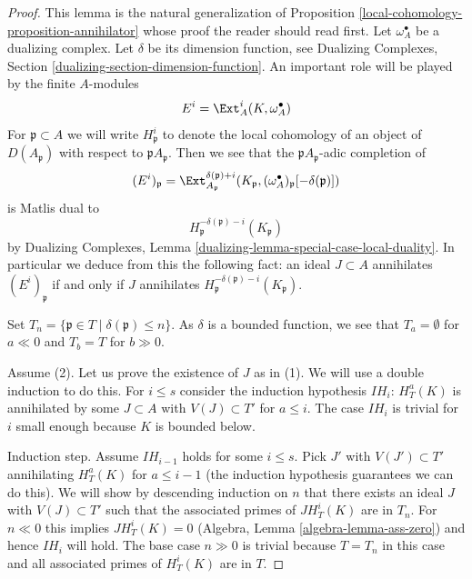 \begin{proof}
This lemma is the natural generalization of
Proposition \ref{local-cohomology-proposition-annihilator}
whose proof the reader should read first.
Let $\omega_A^\bullet$ be a dualizing complex. Let $\delta$ be its
dimension function, see Dualizing Complexes, Section
\ref{dualizing-section-dimension-function}.
An important role will be played by the finite $A$-modules
$$
E^i = \Ext_A^i(K, \omega_A^\bullet)
$$
For $\mathfrak p \subset A$ we will write $H^i_\mathfrak p$ to denote the
local cohomology of an object of $D(A_\mathfrak p)$ with respect to
$\mathfrak pA_\mathfrak p$. Then we see that
the $\mathfrak pA_\mathfrak p$-adic completion of
$$
(E^i)_\mathfrak p =
\Ext^{\delta(\mathfrak p) + i}_{A_\mathfrak p}(K_\mathfrak p,
(\omega_A^\bullet)_\mathfrak p[-\delta(\mathfrak p)])
$$
is Matlis dual to
$$
H^{-\delta(\mathfrak p) - i}_{\mathfrak p}(K_\mathfrak p)
$$
by
Dualizing Complexes, Lemma \ref{dualizing-lemma-special-case-local-duality}.
In particular we deduce from this the
following fact: an ideal $J \subset A$ annihilates
$(E^i)_\mathfrak p$ if and only if $J$ annihilates
$H^{-\delta(\mathfrak p) - i}_{\mathfrak p}(K_\mathfrak p)$.

\medskip\noindent
Set $T_n = \{\mathfrak p \in T \mid \delta(\mathfrak p) \leq n\}$.
As $\delta$ is a bounded function, we see that
$T_a = \emptyset$ for $a \ll 0$ and $T_b = T$ for $b \gg 0$.

\medskip\noindent
Assume (2). Let us prove the existence of $J$ as in (1).
We will use a double induction to do this. For $i \leq s$
consider the induction hypothesis $IH_i$:
$H^a_T(K)$ is annihilated by some $J \subset A$ with $V(J) \subset T'$
for $a \leq i$. The case $IH_i$ is trivial for $i$ small
enough because $K$ is bounded below.

\medskip\noindent
Induction step. Assume $IH_{i - 1}$ holds for some $i \leq s$.
Pick $J'$ with $V(J') \subset T'$ annihilating $H^a_T(K)$ for
$a \leq i - 1$ (the induction hypothesis guarantees we can
do this). We will show by descending induction on $n$
that there exists an ideal $J$ with $V(J) \subset T'$ such that the
associated primes of $J H^i_T(K)$ are in $T_n$.
For $n \ll 0$ this implies $JH^i_T(K) = 0$
(Algebra, Lemma \ref{algebra-lemma-ass-zero})
and hence $IH_i$ will hold.
The base case $n \gg 0$ is trivial because $T = T_n$ in this case
and all associated primes of $H^i_T(K)$ are in $T$.


\end{proof}
